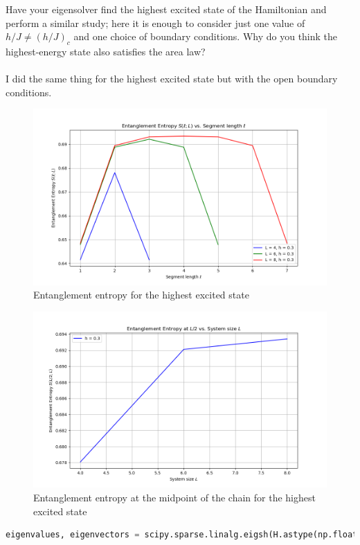 \documentclass[12pt]{article}
\begin{document}
Have your eigensolver find the highest excited state of the Hamiltonian and perform a similar study; here it is enough to consider just one value of $h / J \neq(h / J)_{c}$ and one choice of boundary conditions. Why do you think the highest-energy state also satisfies the area law?\\\\
I did the same thing for the highest excited state but with the open boundary conditions. 
\begin{figure}
\centering
\includegraphics[width=\textwidth]{entanglement_entropy_LA.png}
\caption{Entanglement entropy for the highest excited state}
\end{figure}

\begin{figure}
\centering
\includegraphics[width=\textwidth]{entanglement_entropy_L2_LA.png}
\caption{Entanglement entropy at the midpoint of the chain for the highest excited state}
\end{figure}
\begin{lstlisting}[language=Python]
eigenvalues, eigenvectors = scipy.sparse.linalg.eigsh(H.astype(np.float64), k=1, which='LA')
\end{lstlisting}
\newpage
\end{document}
